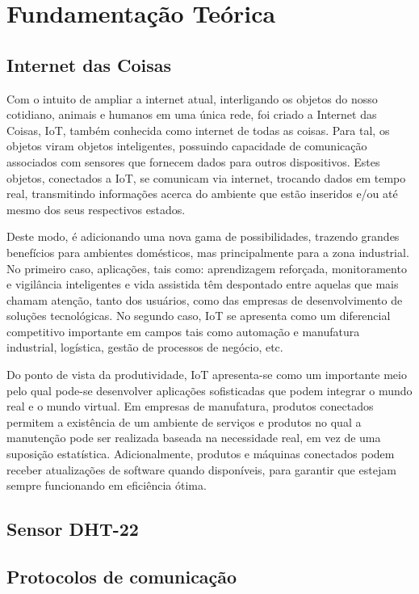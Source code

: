 \chapter{Fundamentação Teórica}
\label{cap:fundamentacao}

\section{Internet das Coisas}
\label{fund:iot}
Com o intuito de ampliar a internet atual, interligando os objetos do nosso cotidiano, animais e humanos em uma única rede, foi criado a Internet das Coisas, IoT, também conhecida como internet de todas as coisas. Para tal, os objetos viram objetos inteligentes, possuindo capacidade de comunicação associados com sensores que fornecem dados para outros dispositivos. Estes objetos, conectados a IoT, se comunicam via internet, trocando dados em tempo real, transmitindo informações acerca do ambiente que estão inseridos e/ou até mesmo dos seus respectivos estados. 

Deste modo, é adicionando uma nova gama de possibilidades, trazendo grandes benefícios para ambientes domésticos, mas principalmente para a zona industrial. No primeiro caso, aplicações, tais como: aprendizagem reforçada, monitoramento e vigilância inteligentes e vida assistida têm despontado entre aquelas que mais chamam atenção, tanto dos usuários, como das empresas de desenvolvimento de soluções tecnológicas. No segundo caso, IoT se apresenta como um diferencial competitivo importante em campos tais como automação e manufatura industrial, logística, gestão de processos de negócio, etc.

Do ponto de vista da produtividade, IoT apresenta-se como um importante meio pelo qual pode-se desenvolver aplicações sofisticadas que podem integrar o mundo real e o mundo virtual. Em empresas de manufatura, produtos conectados permitem a existência de um ambiente de serviços e produtos no qual a manutenção pode ser realizada baseada na necessidade real, em vez de uma suposição estatística. Adicionalmente, produtos e máquinas conectados podem receber atualizações de software quando disponíveis, para garantir que estejam sempre funcionando em eficiência ótima.


\section{Sensor DHT-22}
\label{fund:dht-22}

\section{Protocolos de comunicação}
\label{fund:protocolos}

